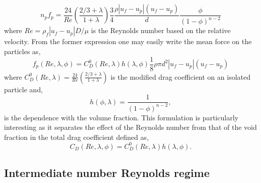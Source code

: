 
\begin{equation}
n_pf_p = \frac{24}{Re}\left(\frac{2/3+\lambda}{1+\lambda}\right)\frac{3}{4}\frac{\rho |u_f-u_p|(u_f-u_p)}{d}\frac{\phi}{(1-\phi)^{n-2}}
\end{equation}
where $Re = \rho_f |u_f-u_p| D/\mu$ is the Reynolds number based on the relative velocity. 
From the former expression one may easily write the mean force on the particles as,
\begin{equation}
f_p (Re,\lambda,\phi) = C_D^0(Re,\lambda)h(\lambda,\phi)\frac{1}{8}\rho \pi d^2 |u_f-u_p|(u_f-u_p)
\label{eq:FCD}
\end{equation}
where $C_D^0(Re,\lambda)=\frac{24}{Re}\left(\frac{2/3+\lambda}{1+\lambda}\right)$ is the modified drag coefficient on an isolated particle and,
\begin{equation}
    h(\phi,\lambda) =\frac{1}{(1-\phi)^{n-2}},
    \label{eq:h_stokes}
\end{equation} 
is the dependence with the volume fraction. 
This formulation is particularly interesting as it separates the effect of the Reynolds number from that of the void fraction in the total drag coefficient defined as,
\begin{equation}
    C_D(Re,\lambda,\phi) = C_D^0(Re,\lambda)h(\lambda,\phi).
    \label{eq:C_d_final}
\end{equation}

\subsection{Intermediate number Reynolds regime}




